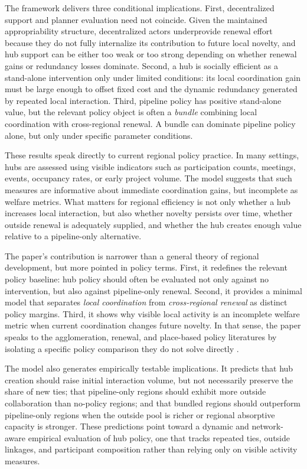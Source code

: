 The framework delivers three conditional implications. First, decentralized support and planner evaluation need not coincide. Given the maintained appropriability structure, decentralized actors underprovide renewal effort because they do not fully internalize its contribution to future local novelty, and hub support can be either too weak or too strong depending on whether renewal gains or redundancy losses dominate. Second, a hub is socially efficient as a stand-alone intervention only under limited conditions: its local coordination gain must be large enough to offset fixed cost and the dynamic redundancy generated by repeated local interaction. Third, pipeline policy has positive stand-alone value, but the relevant policy object is often a \emph{bundle} combining local coordination with cross-regional renewal. A bundle can dominate pipeline policy alone, but only under specific parameter conditions.

These results speak directly to current regional policy practice. In many settings, hubs are assessed using visible indicators such as participation counts, meetings, events, occupancy rates, or early project volume. The model suggests that such measures are informative about immediate coordination gains, but incomplete as welfare metrics. What matters for regional efficiency is not only whether a hub increases local interaction, but also whether novelty persists over time, whether outside renewal is adequately supplied, and whether the hub creates enough value relative to a pipeline-only alternative.

The paper's contribution is narrower than a general theory of regional development, but more pointed in policy terms. First, it redefines the relevant policy baseline: hub policy should often be evaluated not only against no intervention, but also against pipeline-only renewal. Second, it provides a minimal model that separates \emph{local coordination} from \emph{cross-regional renewal} as distinct policy margins. Third, it shows why visible local activity is an incomplete welfare metric when current coordination changes future novelty. In that sense, the paper speaks to the agglomeration, renewal, and place-based policy literatures by isolating a specific policy comparison they do not solve directly \citep{DurantonPuga2004,BatheltMalmbergMaskell2004,Boschma2005,KlineMoretti2014ARE,NeumarkSimpson2015}.

The model also generates empirically testable implications. It predicts that hub creation should raise initial interaction volume, but not necessarily preserve the share of new ties; that pipeline-only regions should exhibit more outside collaboration than no-policy regions; and that bundled regions should outperform pipeline-only regions when the outside pool is richer or regional absorptive capacity is stronger. These predictions point toward a dynamic and network-aware empirical evaluation of hub policy, one that tracks repeated ties, outside linkages, and participant composition rather than relying only on visible activity measures.

